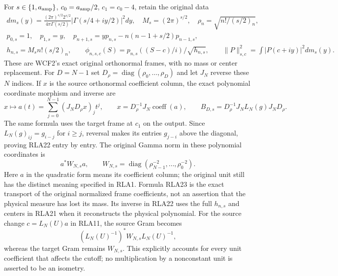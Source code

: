 For $s\in\{1,a_{\rm amp}\}$, $c_0=a_{\rm amp}/2$, $c_1=c_0-4$,
retain the original data
\[
\begin{gathered}
 dm_s(y)=\frac{(2\pi)^{s/2}2^{s/2}}{4\pi\Gamma(s/2)}
       |\Gamma(s/4+iy/2)|^2dy,\quad M_s=(2\pi)^{s/2},\quad
 \rho_n=\sqrt{n!/(s/2)_n},\\
 p_{0,s}=1,\quad p_{1,s}=y,\quad
 p_{n+1,s}=yp_{n,s}-n(n-1+s/2)p_{n-1,s},\\
 h_{n,s}=M_sn!(s/2)_n,\qquad
 \phi_{n,s,c}(S)=p_{n,s}((S-c)/i)/\sqrt{h_{n,s}},\qquad
 \|P\|_{s,c}^2=\int|P(c+iy)|^2dm_s(y).
\end{gathered}\tag{RLA21}
\]
These are WCF2's exact original orthonormal frames, with no mass
or center replacement.  For $D=N-1$ set $D_\rho=\operatorname{diag}
(\rho_0,\ldots,\rho_D)$ and let $J_N$ reverse these $N$ indices.
If $x$ is the source orthonormal coefficient column, the exact
polynomial coordinate morphism and inverse are
\[
 x\longmapsto a(t)=\sum_{j=0}^{N-1}(J_ND_\rho x)_jt^j,
 \qquad x=D_\rho^{-1}J_N\operatorname{coeff}(a),\qquad
 B_{D,s}=D_\rho^{-1}J_NL_N(g)J_ND_\rho.
 \tag{RLA22}
\]
The same formula uses the target frame at $c_1$ on the output.
Since $L_N(g)_{ij}=g_{i-j}$ for $i\ge j$, reversal makes its
entries $g_{j-i}$ above the diagonal, proving RLA22 entry by entry.
The original Gamma norm in these polynomial coordinates is
\[
 a^*W_{N,s}a,\qquad
 W_{N,s}=\operatorname{diag}(\rho_{N-1}^{-2},\ldots,\rho_0^{-2}).
 \tag{RLA23}
\]
Here $a$ in the quadratic form means its coefficient column;
the original unit still has the distinct meaning specified in RLA1.
Formula RLA23 is the exact transport of the original normalized
frame coefficients, not an assertion that the physical measure
has lost its mass.  Its inverse in RLA22 uses the full $h_{n,s}$
and centers in RLA21 when it reconstructs the physical polynomial.
For the source change $c=L_N(U)a$ in RLA11, the source Gram becomes
\[
 (L_N(U)^{-1})^*W_{N,s}L_N(U)^{-1},
 \tag{RLA24}
\]
whereas the target Gram remains $W_{N,s}$.
This explicitly accounts for every unit coefficient that affects
the cutoff; no multiplication by a nonconstant unit is asserted
to be an isometry.


